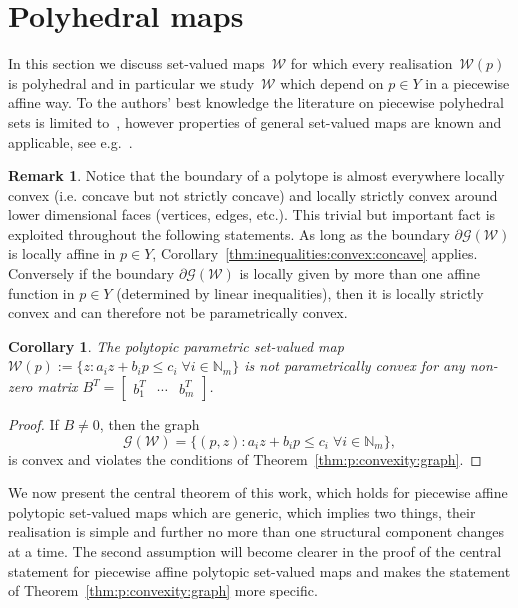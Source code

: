 \documentclass[a4paper, 12pt, twoside]{article}
\newtheorem{cor}[thm]{Corollary}
\theoremstyle{definition}
\newtheorem{rem}[thm]{Remark}
\numberwithin{equation}{section}
\begin{document}
\section{Polyhedral maps}\label{sec:polyhedral:maps}
%
%
%
%
In this section we discuss set-valued maps~$\mathcal W$ for which every realisation~$\mathcal W(p)$ is polyhedral and in particular we study~$\mathcal W$ which depend on $p\in Y$ in a piecewise affine way. 
%
To the authors' best knowledge the literature on piecewise polyhedral sets is limited to~\cite{Finzel:2000}, however properties of general set-valued maps are known and applicable, see e.g.~\cite{Aubin:2009}.
%
\begin{rem}
%
Notice that the boundary of a polytope is almost everywhere locally convex (i.e. concave but not strictly concave) and locally strictly convex around lower dimensional faces (vertices, edges, etc.).
%
This trivial but important fact is exploited throughout the following statements. 
%
As long as the boundary $\partial\mathscr G(\mathcal W)$ is locally affine in $p\in Y$, Corollary~\ref{thm:inequalities:convex:concave} applies. 
%
Conversely if the boundary $\partial\mathscr G(\mathcal W)$ is locally given by more than one affine function in $p\in Y$ (determined by linear inequalities), then it is locally strictly convex and can therefore not be parametrically convex.
\end{rem}
%
\begin{cor}\label{thm:polytopic:set:not:p:convex}
The polytopic parametric set-valued map $\mathcal W(p):=\{z: a_i z + b_i p\leq c_i \; \forall i\in\mathbb N_m\}$
is not parametrically convex for any non-zero matrix $B^T = [\begin{matrix} b_1^T & \cdots & b_m^T\end{matrix}]$.
\end{cor}
%
\begin{proof}
If $B\neq 0$, then the graph
%
\begin{equation*}
	\mathscr G(\mathcal W) = \{(p,z):a_i z + b_i p\leq c_i \; \forall i\in\mathbb N_m\} ,
\end{equation*}
%
is convex and violates the conditions of Theorem~\ref{thm:p:convexity:graph}.
\end{proof}
%
We now present the central theorem of this work, which holds for piecewise affine polytopic set-valued maps which are generic, which implies two things, their realisation is simple and further no more than one structural component changes at a time. 
%
The second assumption will become clearer in the proof of the central statement for piecewise affine polytopic set-valued maps and makes the statement of Theorem~\ref{thm:p:convexity:graph} more specific.
\end{document}
